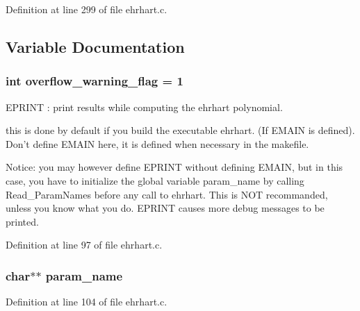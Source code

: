 Definition at line 299 of file ehrhart.c.

\subsection{Variable Documentation}
\subsubsection{\setlength{\rightskip}{0pt plus 5cm}int overflow\_\-warning\_\-flag = 1}\label{ehrhart_8c_a5}


EPRINT : print results while computing the ehrhart polynomial.

this is done by default if you build the executable ehrhart. (If EMAIN is defined). Don't define EMAIN here, it is defined when necessary in the makefile.





Notice: you may however define EPRINT without defining EMAIN, but in this case, you have to initialize the global variable param\_\-name by calling Read\_\-Param\-Names before any call to ehrhart. This is NOT recommanded, unless you know what you do. EPRINT causes more debug messages to be printed. 

Definition at line 97 of file ehrhart.c.
\subsubsection{\setlength{\rightskip}{0pt plus 5cm}char$\ast$$\ast$ param\_\-name}\label{ehrhart_8c_a6}




Definition at line 104 of file ehrhart.c.
